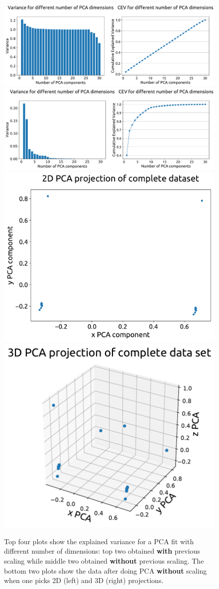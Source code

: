 \documentclass[12pt,a4paper]{article}
\begin{document}
\begin{figure}[ht!]
\centering
\includegraphics[width=\textwidth]{figs/PCA_scaled_variance.pdf}
\includegraphics[width=\textwidth]{figs/PCA_not_scaled_variance.pdf}
\includegraphics[width=0.54 \textwidth]{figs/PCA_2D_data.pdf}
\includegraphics[width=0.45 \textwidth]{figs/PCA_3D_data.pdf}
\caption{Top four plots show the explained variance for a PCA fit with different number of dimensions: top two obtained {\bf{with}} previous scaling while middle two obtained {\bf{without}} previous scaling. The bottom two plots show the data after doing PCA {\bf{without}} scaling when one picks 2D (left) and 3D (right) projections.}
\label{PCA_parfigs}
\end{figure}
\end{document}

